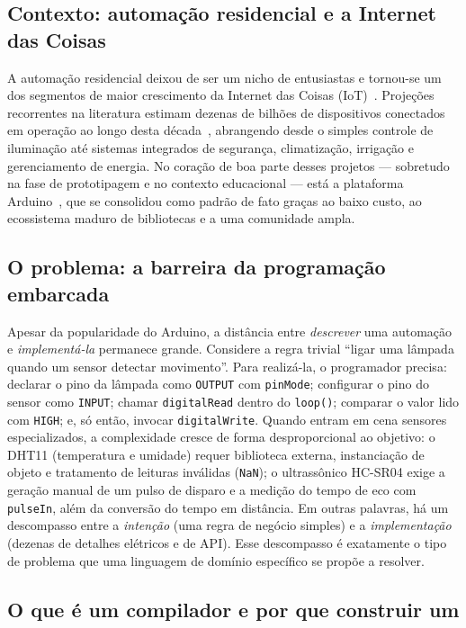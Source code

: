\documentclass[conference]{IEEEtran}
\begin{document}
\subsection{Contexto: automação residencial e a Internet das Coisas}

A automação residencial deixou de ser um nicho de entusiastas e tornou-se
um dos segmentos de maior crescimento da Internet das Coisas
(IoT)~\cite{atzori2010,alfuqaha2015,gubbi2013}. Projeções recorrentes na
literatura estimam dezenas de bilhões de dispositivos conectados em
operação ao longo desta década~\cite{zanella2014}, abrangendo desde o
simples controle de iluminação até sistemas integrados de segurança,
climatização, irrigação e gerenciamento de energia. No coração de boa
parte desses projetos --- sobretudo na fase de prototipagem e no contexto
educacional --- está a plataforma Arduino~\cite{banzi2011}, que se
consolidou como padrão de fato graças ao baixo custo, ao ecossistema
maduro de bibliotecas e a uma comunidade ampla.

\subsection{O problema: a barreira da programação embarcada}

Apesar da popularidade do Arduino, a distância entre \emph{descrever} uma
automação e \emph{implementá-la} permanece grande. Considere a regra
trivial ``ligar uma lâmpada quando um sensor detectar movimento''. Para
realizá-la, o programador precisa: declarar o pino da lâmpada como
\texttt{OUTPUT} com \texttt{pinMode}; configurar o pino do sensor como
\texttt{INPUT}; chamar \texttt{digitalRead} dentro do \texttt{loop()};
comparar o valor lido com \texttt{HIGH}; e, só então, invocar
\texttt{digitalWrite}. Quando entram em cena sensores especializados, a
complexidade cresce de forma desproporcional ao objetivo: o DHT11
(temperatura e umidade) requer biblioteca externa, instanciação de objeto
e tratamento de leituras inválidas (\texttt{NaN}); o ultrassônico HC-SR04
exige a geração manual de um pulso de disparo e a medição do tempo de eco
com \texttt{pulseIn}, além da conversão do tempo em distância. Em outras
palavras, há um descompasso entre a \emph{intenção} (uma regra de
negócio simples) e a \emph{implementação} (dezenas de detalhes elétricos
e de API). Esse descompasso é exatamente o tipo de problema que uma
linguagem de domínio específico se propõe a resolver.

\subsection{O que é um compilador e por que construir um}
\end{document}

